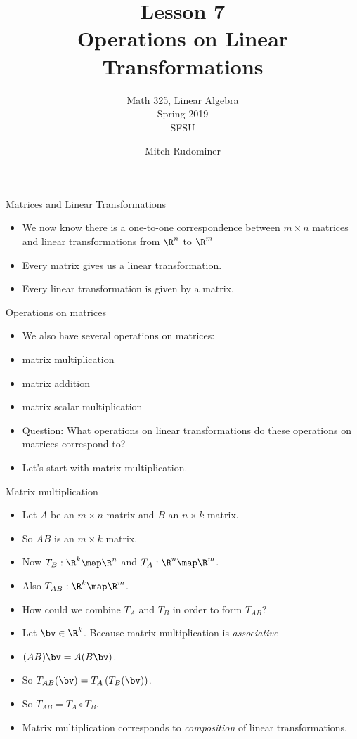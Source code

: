 \documentclass{beamer}
\title{Lesson 7 \\ Operations on Linear Transformations}
\subtitle{Math 325, Linear Algebra \\ Spring 2019 \\ SFSU}
\author{Mitch Rudominer}
\date{}
\begin{document}
\begin{frame}
  \titlepage
\end{frame}


\begin{frame}{Matrices and Linear Transformations}

\begin{itemize}
\item We now know there is a one-to-one correspondence between $m\times n$ matrices and linear
transformations from $\R^n$ to $\R^m$
\item Every matrix gives us a linear transformation.
\item Every linear transformation is given by a matrix.
\end{itemize}

\end{frame}

\begin{frame}{Operations on matrices}

\begin{itemize}
\item We also have several operations on matrices:
\item matrix multiplication
\item matrix addition
\item matrix scalar multiplication
\item Question: What operations on linear transformations do these
operations on matrices correspond to?
\item Let's start with matrix multiplication.
\end{itemize}

\end{frame}

\begin{frame}{Matrix multiplication}

\begin{itemize}
\item Let $A$ be an $m\times n$ matrix and $B$ an $n\times k$ matrix.
\item So $A B$ is an $m\times k$ matrix.
\item Now $T_B:\R^k\map\R^n$ and $T_A:\R^n\map\R^m$.
\item Also $T_{AB}:\R^k\map\R^m$.
\item How could we combine $T_A$ and $T_B$ in order to form $T_{AB}$?
\item Let $\bv\in\R^k$. Because matrix multiplication is \emph{associative}
\item $(A B) \bv = A (B \bv)$.
\item So $T_{AB}(\bv) = T_A\left( T_B(\bv) \right)$.
\item So $T_{AB} = T_A \circ T_B$.
\item Matrix multiplication corresponds to \emph{composition} of linear transformations.
\end{itemize}
\end{frame}
\end{document}
